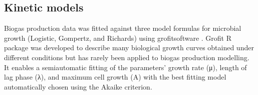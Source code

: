 \subsection{Kinetic models}
Biogas production data was fitted against three model formulas for microbial growth (Logistic, Gompertz, and Richards) using grofitsoftware \cite{Kahm_2010}. Grofit R package was developed to describe many biological growth curves obtained under different conditions but has rarely been applied to biogas production modelling. It enables a semiautomatic fitting of the parameters’ growth rate (μ), length of lag phase (λ), and maximum cell growth (A) with the best fitting model automatically chosen using the Akaike criterion.